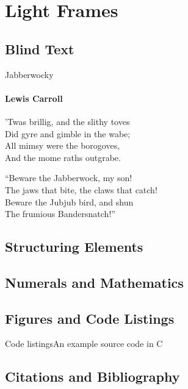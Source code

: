 \documentclass{beamer}
\begin{document}
\begin{darkframes}
  \end{darkframes}

  \section{Light Frames}
    \subsection{Blind Text}
    \begin{frame}{Jabberwocky}
      \framesubtitle{Lewis Carroll}%
      
      'Twas brillig, and the slithy toves\\
      Did gyre and gimble in the wabe;\\
      All mimsy were the borogoves,\\
      And the mome raths outgrabe.\\\bigskip

      “Beware the Jabberwock, my son!\\
      The jaws that bite, the claws that catch!\\
      Beware the Jubjub bird, and shun\\
      The frumious Bandersnatch!”\\
    \end{frame}
    \subsection{Structuring Elements}
    \subsection{Numerals and Mathematics}
    \subsection{Figures and Code Listings}
  \begin{frame}{Code listings}{An example source code in C}
      \sleepSort
    \end{frame}
    \subsection{Citations and Bibliography}
\end{document}
